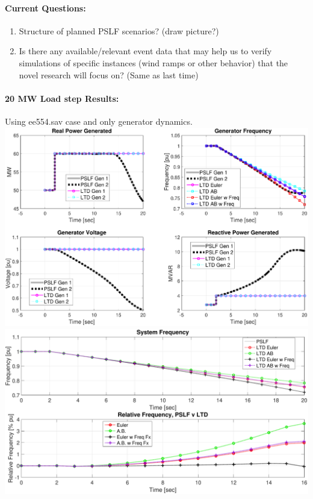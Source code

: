 \documentclass[12pt]{article}
\begin{document}
	\paragraph{Current Questions:}
	\begin{enumerate}
		
		
		\item Structure of planned PSLF scenarios? (draw picture?)
		
		\item Is there any available/relevant event data that may help us to verify simulations of specific instances (wind ramps or other behavior) that the novel research will focus on? (Same as last time)
	\end{enumerate}

\pagebreak
\paragraph{20 MW Load step Results:} Using ee554.sav case and only generator dynamics.\\

\includegraphics[width=\linewidth]{noGov_LTD01.pdf}
\includegraphics[width=\linewidth]{noGov_LTD04.pdf}
\end{document}
